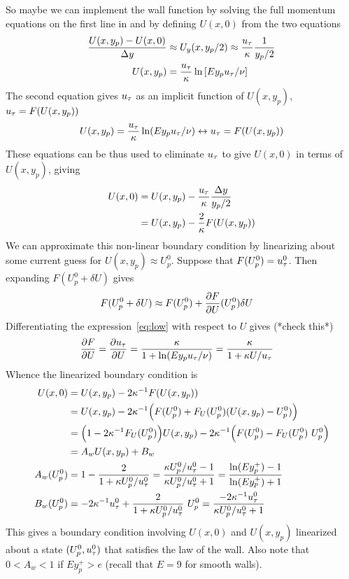 So maybe we can implement the wall function by solving the full momentum equations on the first line in and
by defining $U(x,0)$ from the two equations
\begin{align}
  { U(x,y_p)-U(x,0) \over \Delta y } &\approx U_y(x,y_p/2) \approx {u_\tau\over\kappa} {1\over y_p/2 } \\
  U(x,y_p) &= {u_\tau \over\kappa} \ln\left[ E y_p u_\tau/\nu \right]
\end{align}
The second equation gives $u_\tau$ as an implicit function of $U(x,y_p)$, $u_\tau=F(U(x,y_p))$
\begin{align} 
  U(x,y_p)  & = {u_\tau \over\kappa} \ln( E y_p u_\tau/\nu )   \leftrightarrow u_\tau = F(U(x,y_p)) \label{eq:low} \\
\end{align}
These equations can be thus used to eliminate $u_\tau$ to give $U(x,0)$ in terms of $U(x,y_p)$, giving
\begin{align}
  U(x,0) & = U(x,y_p) -  {u_\tau \over\kappa} { \Delta y \over y_p/2 } \\
         & = U(x,y_p) -  {2\over \kappa} F(U(x,y_p))
\end{align}
We can approximate this non-linear boundary condition by linearizing about some current guess for $U(x,y_p)\approx U_p^0$. 
Suppose that $F(U_p^0)=u_\tau^0$. Then expanding $F(U_p^0 + \delta U)$ gives 
\begin{align*}
  F(U_p^0 + \delta U) &\approx F(U_p^0) + {\partial F \over \partial U}(U_p^0) \delta U 
\end{align*}
Differentiating the expression~\eqref{eq:low} with respect to $U$ gives (*check this*)
\begin{align*}
  {\partial F \over \partial U} &=  
           {\partial u_\tau \over \partial U} = { \kappa \over 1+ \ln( E y_p u_\tau/\nu) }  = {  \kappa \over 1 + \kappa U /u_\tau } 
\end{align*}
Whence the linearized boundary condition is 
\begin{align*}
  U(x,0) & = U(x,y_p) -  2\kappa^{-1}F(U(x,y_p)) \\
         & = U(x,y_p) -  2\kappa^{-1}\Big( F(U_p^0) + F_U(U_p^0)( U(x,y_p) -U_p^0 ) \Big) \\
         & = \Big(1 - 2\kappa^{-1} F_U(U_p^0)\Big) U(x,y_p) - 2\kappa^{-1}\Big( F(U_p^0) - F_U(U_p^0)~U_p^0 \Big) \\
         & = A_w U(x,y_p) + B_w \\
  A_w(U_p^0) & = 1 - {2\over 1 + \kappa U_p^0 /u_\tau^0 } = {\kappa U_p^0 /u_\tau^0 - 1 \over \kappa U_p^0 /u_\tau^0 +1}
             = {\ln(E y_p^+) -1 \over \ln(E y_p^+) + 1} \\
  B_w (U_p^0) & = - 2\kappa^{-1} u_\tau^0 + {2 \over 1 + \kappa U_p^0 /u_\tau^0 }~U_p^0 
              = { - 2\kappa^{-1} u_\tau^0 \over \kappa U_p^0 /u_\tau^0 +1}
\end{align*}
This gives a boundary condition involving $U(x,0)$ and $U(x,y_p)$ linearized about a state $(U_p^0,u_\tau^0)$ that
satisfies the law of the wall. Also note that $0< A_w <1 $ if $E y_p^+ > e$ (recall that $E=9$ for smooth walls).

